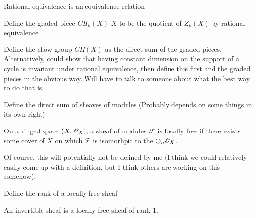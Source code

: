 \begin{lemma}
  \label{lem:ratequivisequiv}
  Rational equivalence is an equivalence relation
\end{lemma}

\begin{definition}
  \label{def:chowgroupgraded}
  Define the graded piece $CH_k(X)$ $X$ to be the quotient of $Z_k(X)$ by rational equivalence
\end{definition}

\begin{definition}
  \label{def:chowgroup}
  Define the chow group $CH(X)$ as the direct sum of the graded pieces. Alternatively,
  could show that having constant dimension on the support of a cycle is invariant under
  rational equivalence, then define this first and the graded pieces in the obvious way.
  Will have to talk to someone about what the best way to do that is.
\end{definition}

\begin{definition}
  \label{def:directsumsheafmodules}
  Define the direct sum of sheaves of modules (Probably depends on some things in its own right)
\end{definition}

\begin{definition}
  \label{def:locallyfreesheaf}
  On a ringed space $(X, \mathscr{O}_X)$, a sheaf of modules $\mathscr{F}$ is locally free if 
  there exists some cover of $X$ on which $\mathscr{F}$ is isomorhpic to the $\oplus_n \mathscr{O}_X$.

  Of course, this will potentially not be defined by me (I think we could relatively easily
  come up with a definition, but I think others are working on this somehow). 
\end{definition}

\begin{definition}
  \label{def:locallyfreerank}
  Define the rank of a locally free sheaf
\end{definition}

\begin{definition}
  \label{def:invertiblesheaf}
  An invertible sheaf is a locally free sheaf of rank 1.
\end{definition}

